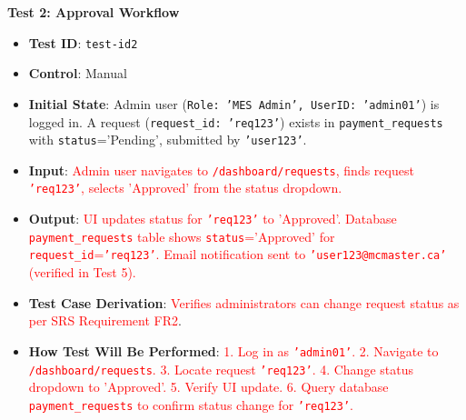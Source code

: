 \documentclass[12pt, titlepage]{article}
\begin{document}
\textbf{Test 2: Approval Workflow} \label{test-id2}
\begin{itemize}
    \item \textbf{Test ID}: \texttt{test-id2}
    \item \textbf{Control}: Manual
    \item \textbf{Initial State}: Admin user (\texttt{Role: 'MES Admin', UserID: 'admin01'}) is logged in. A request (\texttt{request\_id: 'req123'}) exists in \texttt{payment\_requests} with \texttt{status}='Pending', submitted by \texttt{'user123'}.
    \item \textbf{Input}: \textcolor{red}{Admin user navigates to \texttt{/dashboard/requests}, finds request \texttt{'req123'}, selects 'Approved' from the status dropdown.}
    \item \textbf{Output}: \textcolor{red}{UI updates status for \texttt{'req123'} to 'Approved'. Database \texttt{payment\_requests} table shows \texttt{status}='Approved' for \texttt{request\_id}=\texttt{'req123'}. Email notification sent to \texttt{'user123@mcmaster.ca'} (verified in Test 5).}
    \item \textbf{Test Case Derivation}: \textcolor{red}{Verifies administrators can change request status as per SRS Requirement FR2}.
    \item \textbf{How Test Will Be Performed}: \textcolor{red}{1. Log in as \texttt{'admin01'}. 2. Navigate to \texttt{/dashboard/requests}. 3. Locate request \texttt{'req123'}. 4. Change status dropdown to 'Approved'. 5. Verify UI update. 6. Query database \texttt{payment\_requests} to confirm status change for \texttt{'req123'}.}
\end{itemize}
\end{document}
